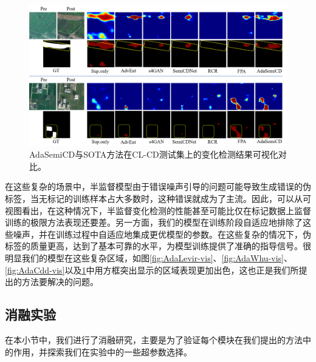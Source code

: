 \documentclass[lang=chs, degree=master, blindreview=false, adobe=false]{yanputhesis}
\begin{document}
\begin{figure}[!htbp]
  \centering
  \includegraphics[scale=0.45]{images/AdaCl-vis.png}
  \caption{
    AdaSemiCD与SOTA方法在CL-CD测试集上的变化检测结果可视化对比。
  }
  \label{fig:AdaCl-vis}
  \end{figure}

在这些复杂的场景中，半监督模型由于错误噪声引导的问题可能导致生成错误的伪标签，当无标记的训练样本占大多数时，这种错误就成为了主流。因此，可以从可视图看出，在这种情况下，半监督变化检测的性能甚至可能比仅在标记数据上监督训练的极限方法表现还要差。另一方面，我们的模型在训练阶段自适应地排除了这些噪声，并在训练过程中自适应地集成更优模型的参数。在这些复杂的情况下，伪标签的质量更高，达到了基本可靠的水平，为模型训练提供了准确的指导信号。很明显我们的模型在这些复杂区域，如图\ref{fig:AdaLevir-vis}、\ref{fig:AdaWhu-vis}、\ref{fig:AdaCdd-vis}以及\ref{fig:AdaCl-vis}中用方框突出显示的区域表现更加出色，这也正是我们所提出的方法要解决的问题。
\subsection{消融实验}
在本小节中，我们进行了消融研究，主要是为了验证每个模块在我们提出的方法中的作用，并探索我们在实验中的一些超参数选择。
\end{document}
